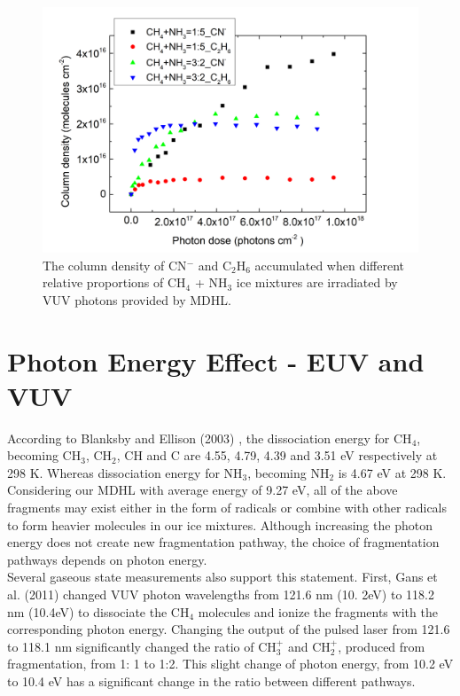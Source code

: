 \begin{figure}
\centering
\includegraphics[width=\textwidth]{figures/chapter3/C2H6_CN_comparison.png}
\caption{The column density of CN$^-$ and C$_2$H$_6$ accumulated when different relative proportions of CH$_4$ + NH$_3$ ice mixtures are irradiated by VUV photons provided by MDHL.}
\label{fig:C2H6_CN_comparison}
\end{figure}


\section{Photon Energy Effect - EUV and VUV} %

According to Blanksby and Ellison (2003) \cite{blanksby2003bond}, the dissociation energy for CH$_4$, becoming CH$_3$, CH$_2$, CH and C are 4.55, 4.79, 4.39 and 3.51 eV respectively at 298 K. Whereas dissociation energy for NH$_3$, becoming NH$_2$ is 4.67 eV at 298 K.\\

Considering our MDHL with average energy of 9.27 eV, all of the above fragments may exist either in the form of radicals or combine with other radicals to form heavier molecules in our ice mixtures. Although increasing the photon energy does not create new fragmentation pathway, the choice of fragmentation pathways depends on photon energy.\\

Several gaseous state measurements also support this statement. First, Gans et al. (2011) \cite{gans2011photolysis} changed VUV photon wavelengths from 121.6 nm (10. 2eV) to 118.2 nm (10.4eV) to dissociate the CH$_4$ molecules and ionize the fragments with the corresponding photon energy. Changing the output of the pulsed laser from 121.6 to 118.1 nm significantly changed the ratio of CH$_3^+$ and CH$_2^+$, produced from fragmentation, from 1: 1 to 1:2. This slight change of photon energy, from 10.2 eV to 10.4 eV has a significant change in the ratio between different pathways.\\

